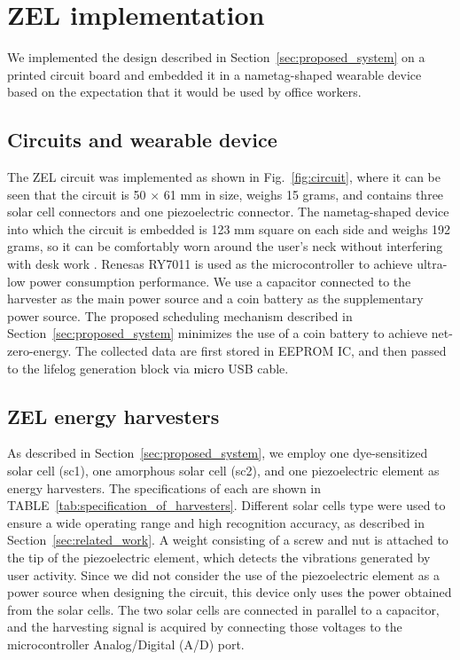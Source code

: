 \documentclass[conference]{IEEEtran}
\newcommand{\add}[1]{\textcolor{black}{#1}}	%
\newcommand{\erase}[1]{\if0{#1}\fi}	%
\begin{document}
\section{ZEL implementation} 
\label{sec:implementation}
We implemented the design described in Section~\ref{sec:proposed_system} on a printed circuit board and embedded it in a nametag-shaped wearable device based on the expectation that it would be used by office workers.

\subsection{Circuit\add{s} and wearable device}
The ZEL circuit was implemented as shown in Fig.~\ref{fig:circuit}, where it can be seen that the circuit is 50 $\times$ 61 mm in size, weighs 15 grams, and contains three solar cell connectors and one piezoelectric connector.
The nametag-shaped device into which the circuit is embedded is 123 mm square on each side and weighs 192 grams, so it can be comfortably worn around the user's neck without interfering with desk work \erase{, as shown in Fig.~\ref{fig:ZEL}}.
Renesas RY7011 is used as the microcontroller to achieve ultra-low power consumption performance.
We use a capacitor connected to the harvester\erase{s} as the main power source and a coin battery as the supplementary power source.
The proposed scheduling mechanism described in Section~\ref{sec:proposed_system} minimizes the use of a coin battery to achieve net-zero-energy.
The collected data are first stored in EEPROM IC, and then passed to the lifelog generation block via \erase{Micro} \add{micro} USB cable.

\subsection{ZEL energy harvesters}
As described in Section~\ref{sec:proposed_system}, we employ one dye-sensitized solar cell (sc1), one amorphous solar cell (sc2), and one piezoelectric element as energy harvesters.
The specifications of each are shown in TABLE~\ref{tab:specification_of_harvesters}.
Different solar cells type were used to ensure a wide operating range and high recognition accuracy, as described in Section~\ref{sec:related_work}.
A weight consisting of a screw and nut is attached to the tip of the piezoelectric element, which detects \add{the} vibrations generated by user activity.
Since we did not consider the use of the piezoelectric element as a power source when designing the circuit, this device only uses \add{the} power obtained from the solar cells.
%
The two solar cells are connected in parallel to a capacitor, and the harvesting signal is acquired by connecting those voltages to the microcontroller Analog/Digital (A/D) port.
\end{document}
